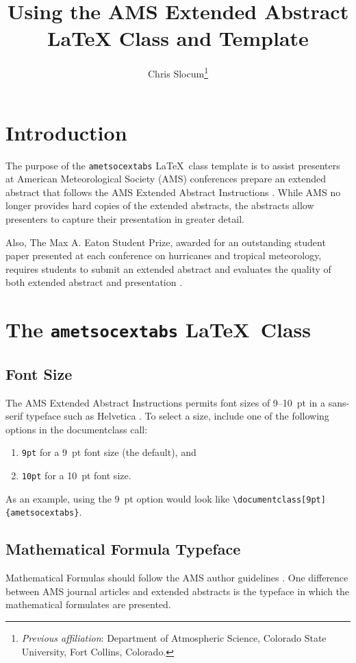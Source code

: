 \documentclass[9pt]{ametsocextabs}
\title{Using the AMS Extended Abstract LaTeX Class and Template}
\author{Chris Slocum\aff{a}\thanks{\textit{Previous affiliation}: Department of Atmospheric Science, Colorado State University, Fort Collins, Colorado.}\correspondingauthor{Chris Slocum, \url{https://github.com/CSlocumWX/}}
}
\affiliation{\aff{a}{Fort Collins, Colorado}}
\begin{document}
\maketitle
\section{Introduction}
The purpose of the \lowercase{\texttt{ametsocextabs}} \LaTeX\ class
template is to assist presenters at American Meteorological Society
(AMS) conferences prepare an extended abstract that follows the AMS
Extended Abstract Instructions \citep{AMS2025abs}. While AMS no
longer provides hard copies of the extended abstracts, the abstracts
allow presenters to capture their presentation in greater detail.

Also, The Max A. Eaton Student Prize, awarded for an outstanding
student paper presented at each conference on hurricanes and tropical
meteorology, requires students to submit an extended abstract and
evaluates the quality of both extended abstract and presentation
\citep{AMS2025student, AMS2025Eaton}.

\section{The \lowercase{\texttt{ametsocextabs}} \LaTeX\ Class}

\subsection{Font Size}

The AMS Extended Abstract Instructions permits font sizes of 9--10~pt
in a sans-serif typeface such as Helvetica \citep{AMS2025abs}.
To select a size, include one of the following options in the
documentclass call:
\begin{enumerate}
    \item \texttt{9pt} for a 9~pt font size (the default), and
    \item \texttt{10pt} for a 10~pt font size.
\end{enumerate}
As an example, using the 9~pt option would look like
\texttt{\textbackslash documentclass[9pt]\{ametsocextabs\}}.

\subsection{Mathematical Formula Typeface}
Mathematical Formulas should follow the AMS author guidelines
\citep{AMS2025math}. One difference between AMS journal articles
and extended abstracts is the typeface in which the mathematical
formulates are presented.
\end{document}
